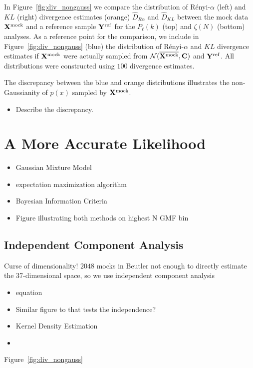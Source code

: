 \documentclass[12pt, letterpaper, preprint]{aastex}
\newcommand{\bitem}{\begin{itemize}}
\newcommand{\eitem}{\end{itemize}}
\begin{document}
In Figure~\ref{fig:div_nongauss} we compare the distribution of 
R\'enyi-$\alpha$ (left) and $KL$ (right) divergence estimates (orange)
$\hat{D}_{R\alpha}$ and $\hat{D}_{KL}$
between the mock data ${\bf X}^\mathrm{mock}$ and a reference sample 
${\bf Y}^\mathrm{ref}$ for the $P_\ell(k)$ (top) and $\zeta(N)$ (bottom) analyses.
As a reference point for the comparison, we include in Figure~\ref{fig:div_nongauss} 
(blue) the distribution of R\'enyi-$\alpha$ and $KL$ divergence estimates if 
${\bf X}^\mathrm{mock}$ were actually sampled from $\mathcal{N}(\overline{{\bf X}^\mathrm{mock}}, {\bf C})$ 
and ${\bf Y}^\mathrm{ref}$. All distributions were constructed using $100$ 
divergence estimates. 

The discrepancy between the blue and orange distributions illustrates the
non-Gaussianity of $p(x)$ sampled by ${\bf X}^\mathrm{mock}$. 
\bitem 
    \item Describe the discrepancy. 
\eitem

\section{A More Accurate Likelihood} 
\bitem
    \item Gaussian Mixture Model 
    \item expectation maximization algorithm \cite{dempster1977}
    \item Bayesian Information Criteria 
    \item Figure illustrating both methods on highest N GMF bin 
\eitem

\subsection{Independent Component Analysis} 
Curse of dimensionality! $2048$ mocks in Beutler not enough to directly estimate 
the 37-dimensional space, so we use independent component analysis 
\cite{hartlap2009}
\bitem
    \item equation 
    \item Similar figure to \cite{hartlap2009} that tests the independence? 
    \item Kernel Density Estimation 
    \item 
\eitem
Figure~\ref{fig:div_nongauss}
\end{document}
